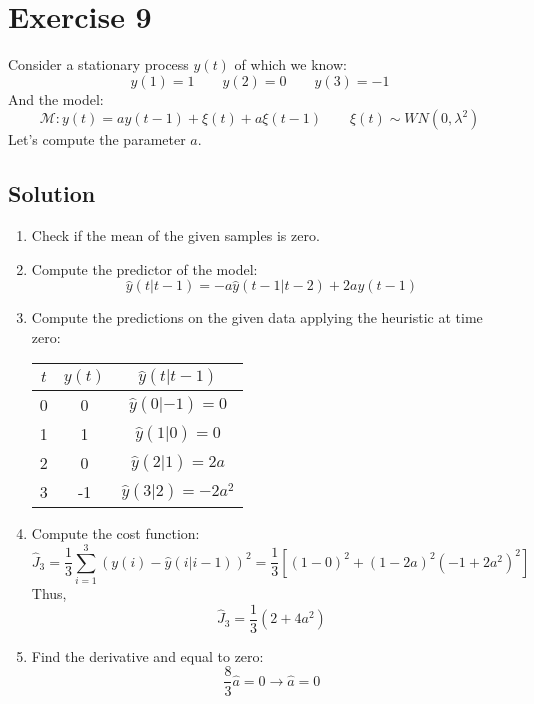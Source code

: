 \section{Exercise 9}

Consider a stationary process $y(t)$ of which we know: 
\[y(1)=1 \qquad y(2)=0 \qquad y(3)=-1\]
And the model: 
\[\mathcal{M}:y(t)=ay(t-1)+\xi(t)+a\xi(t-1)\qquad \xi(t)\sim WN(0,\lambda^2)\]
Let's compute the parameter $a$. 

\subsection*{Solution}
\begin{enumerate}
    \item Check if the mean of the given samples is zero.
    \item Compute the predictor of the model:
        \[\hat{y}(t|t-1)=-a\hat{y}(t-1|t-2)+2ay(t-1)\]
    \item Compute the predictions on the given data applying the heuristic at time zero:
        \begin{table}[H]
            \centering
            \begin{tabular}{ccc}
            \hline
            $t$ & $y(t)$ & $\hat{y}(t|t-1)$     \\ \hline
            0   & 0      & $\hat{y}(0|-1)=0$    \\
            1   & 1      & $\hat{y}(1|0)=0$     \\
            2   & 0      & $\hat{y}(2|1)=2a$    \\
            3   & -1     & $\hat{y}(3|2)=-2a^2$ \\ \hline
            \end{tabular}
        \end{table}
    \item Compute the cost function: 
        \[\hat{J}_3=\dfrac{1}{3}\sum_{i=1}^{3}{\left(y(i)-\hat{y}(i|i-1)\right)}^2=\dfrac{1}{3}\left[{\left(1-0\right)}^2+{\left(1-2a\right)}^2{\left(-1+2a^2\right)}^2\right]\]
        Thus, 
        \[\hat{J}_3=\dfrac{1}{3}\left(2+4a^2\right)\]
    \item Find the derivative and equal to zero: 
        \[\dfrac{8}{3}\hat{a}=0\rightarrow \hat{a}=0\]
\end{enumerate}